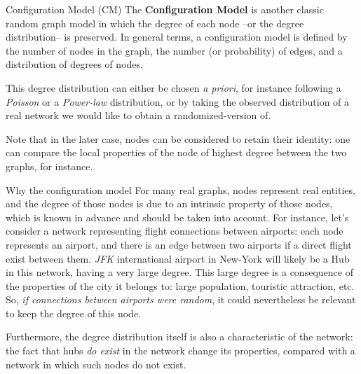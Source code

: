 \documentclass[a4paper,11pt]{book}
\begin{document}
\begin{textbox}{Configuration Model (CM)}
The \textbf{Configuration Model} is another classic random graph model in which the degree of each node --or the degree distribution-- is preserved. In general terms, a configuration model is defined by the number of nodes in the graph, the number (or probability) of edges, and a distribution of degrees of nodes. 

This degree distribution can either be chosen \textit{a priori}, for instance following a \textit{Poisson} or a \textit{Power-law} distribution, or by taking the observed distribution of a real network we would like to obtain a randomized-version of.

Note that in the later case, nodes can be considered to retain their identity: one can compare the local properties of the node of highest degree between the two graphs, for instance.
\end{textbox}




\begin{textbox}{Why the configuration model}
For many real graphs, nodes represent real entities, and the degree of those nodes is due to an intrinsic property of those nodes, which is known in advance and should be taken into account. For instance, let's consider a network representing flight connections between airports: each node represents an airport, and there is an edge between two airports if a direct flight exist between them. \textit{JFK} international airport in New-York will likely be a Hub in this network, having a very large degree. This large degree is a consequence of the properties of the city it belongs to: large population, touristic attraction, etc. So, \textit{if connections between airports were random}, it could nevertheless be relevant to keep the degree of this node.

Furthermore, the degree distribution itself is also a characteristic of the network: the fact that hubs \textit{do exist} in the network change its properties, compared with a network in which such nodes do not exist.
\end{textbox}
\end{document}
